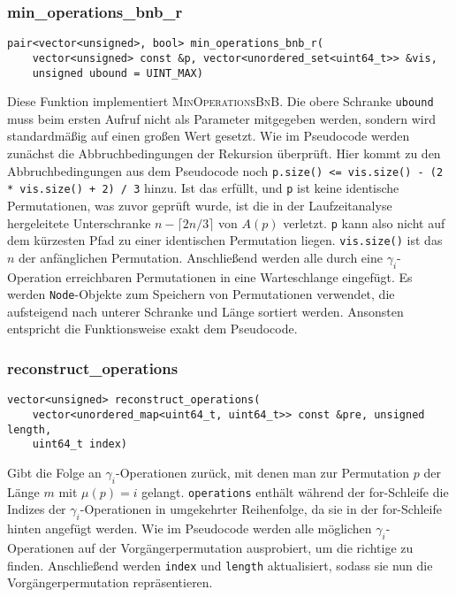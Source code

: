 \documentclass[a4paper, 10pt, ngerman]{article}
\begin{document}
\subsubsection{min\_operations\_bnb\_r}
\verb|pair<vector<unsigned>, bool> min_operations_bnb_r(| \\
\verb|    vector<unsigned> const &p, vector<unordered_set<uint64_t>> &vis,| \\
\verb|    unsigned ubound = UINT_MAX)|
\medskip

\noindent Diese Funktion implementiert \textsc{MinOperationsBnB}. Die obere Schranke \verb|ubound| muss beim ersten Aufruf nicht als Parameter mitgegeben werden, sondern wird standardmäßig auf einen großen Wert gesetzt. Wie im Pseudocode werden zunächst die Abbruchbedingungen der Rekursion überprüft. Hier kommt zu den Abbruchbedingungen aus dem Pseudocode noch \verb|p.size() <= vis.size() - (2 * vis.size() + 2) / 3| hinzu. Ist das erfüllt, und \verb|p| ist keine identische Permutationen, was zuvor geprüft wurde, ist die in der Laufzeitanalyse hergeleitete Unterschranke $n - \lceil 2n / 3 \rceil$ von $A(p)$ verletzt. \verb|p| kann also nicht auf dem kürzesten Pfad zu einer identischen Permutation liegen. \verb|vis.size()| ist das $n$ der anfänglichen Permutation. Anschließend werden alle durch eine $\gamma_i$-Operation erreichbaren Permutationen in eine Warteschlange eingefügt. Es werden \verb|Node|-Objekte zum Speichern von Permutationen verwendet, die aufsteigend nach unterer Schranke und Länge sortiert werden. Ansonsten entspricht die Funktionsweise exakt dem Pseudocode.

\subsubsection{reconstruct\_operations}
\verb|vector<unsigned> reconstruct_operations(| \\
\verb|    vector<unordered_map<uint64_t, uint64_t>> const &pre, unsigned length,| \\
\verb|    uint64_t index)|
\medskip

\noindent Gibt die Folge an $\gamma_i$-Operationen zurück, mit denen man zur Permutation $p$ der Länge $m$ mit $\mu(p) = i$ gelangt. \verb|operations| enthält während der for-Schleife die Indizes der $\gamma_i$-Operationen in umgekehrter Reihenfolge, da sie in der for-Schleife hinten angefügt werden. Wie im Pseudocode werden alle möglichen $\gamma_i$-Operationen auf der Vorgängerpermutation ausprobiert, um die richtige zu finden. Anschließend werden \verb|index| und \verb|length| aktualisiert, sodass sie nun die Vorgängerpermutation repräsentieren.
\end{document}
